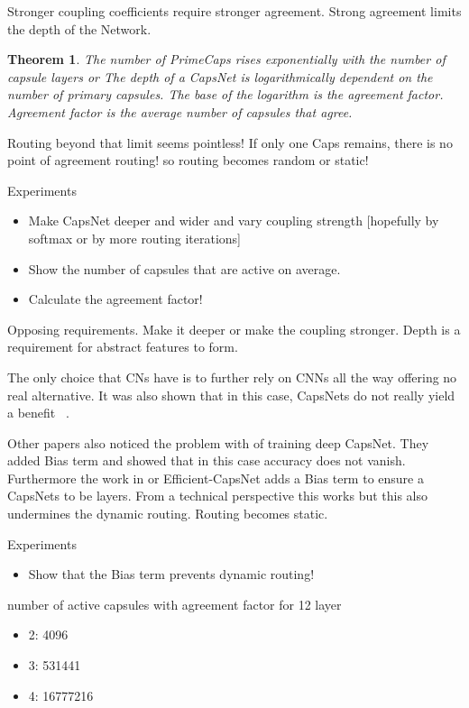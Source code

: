\documentclass{article}
\newtheorem{theorem}{Theorem}
\begin{document}
Stronger coupling coefficients require stronger agreement. 
Strong agreement limits the depth of the Network.

\begin{theorem}
	The number of PrimeCaps rises exponentially with the number of capsule layers or
	The depth of a CapsNet is logarithmically dependent on the number of primary capsules.
	The base of the logarithm is the agreement factor.
	Agreement factor is the average number of capsules that agree.
\end{theorem}
Routing beyond that limit seems pointless!
If only one Caps remains, there is no point of agreement routing! so routing becomes random or static!

Experiments
\begin{itemize}
	\item Make CapsNet deeper and wider and vary coupling strength [hopefully by softmax or by more routing iterations]
	\item Show the number of capsules that are active on average.
	\item Calculate the agreement factor!
\end{itemize}

Opposing requirements. Make it deeper or make the coupling stronger.
Depth is a requirement for abstract features to form.

The only choice that CNs have is to further rely on CNNs all the way offering no real alternative.
It was also shown that in this case, CapsNets do not really yield a benefit ~\cite{acml/PaikKK19}.

Other papers also noticed the problem with of training deep CapsNet. They added Bias term and showed that in this case accuracy does not vanish.
Furthermore the work in \cite{prl/PeerSR21} or Efficient-CapsNet adds a Bias term to ensure a CapsNets to be layers.
From a technical perspective this works but this also undermines the dynamic routing.
Routing becomes static.

Experiments
\begin{itemize}
	\item Show that the Bias term prevents dynamic routing!
\end{itemize}

number of active capsules with agreement factor for 12 layer
\begin{itemize}
	\item 2: 4096
	\item 3: 531441
	\item 4: 16777216
\end{itemize}
\end{document}
